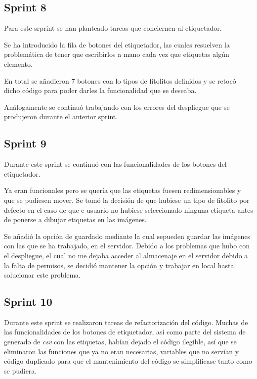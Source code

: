 \subsection{Sprint 8}

Para este srprint se han planteado tareas que conciernen al etiquetador. 

Se ha introducido la fila de botones del etiquetador, las cuales resuelven la problemática de tener que escribirlos a mano cada vez que etiquetas algún elemento.

En total se añadieron 7 botones con lo tipos de fitolitos definidos y se retocó dicho código para poder darles la funcionalidad que se deseaba.

Análogamente se continuó trabajando con los errores del despliegue que se produjeron durante el anterior sprint.


\subsection{Sprint 9}

Durante este sprint se continuó con las funcionalidades de los botones del etiquetador.

Ya eran funcionales pero se quería que las etiquetas fuesen redimensionables y que se pudiesen mover.
Se tomó la decisión de que hubiese un tipo de fitolito por defecto en el caso de que e usuario no hubiese seleccionado ninguna etiqueta antes de ponerse a dibujar etiquetas en las imágenes.

Se añadió la opción de guardado mediante la cual sepueden guardar las imágenes con las que se ha trabajado, en el servidor. Debido a los problemas que hubo con el despliegue, el cual no me dejaba acceder al almacenaje en el servidor debido a la falta de permisos, se decidió mantener la opción y trabajar en local hasta solucionar este problema.



\subsection{Sprint 10}

Durante este sprint se realizaron tareas de refactorización del código. Muchas de las funcionalidades de los botones de etiquetador, así como parte del sistema de generado de \textit{csv} con las etiquetas, habían dejado el código ilegible, así que se eliminaron las funciones que ya no eran necesarias, variables que no servían y código duplicado para que el mantenimiento del código se simplificase tanto como se pudiera.

